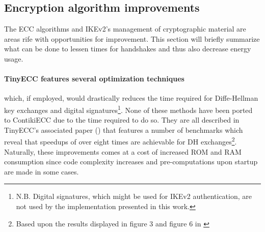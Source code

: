 \documentclass[final,a4paper,twoside,11pt,onecolumn]{report}
\begin{document}



%


\subsection{Encryption algorithm improvements}
\label{sec:ecc-improvements}
The ECC algorithms and IKEv2's management of cryptographic material are areas rife with opportunities for improvement. This section will briefly summarize what can be done to lessen times for handshakes and thus also decrease energy usage.

\paragraph{TinyECC features several optimization techniques} which, if employed, would drastically reduces the time required for Diffe-Hellman key exchanges and digital signatures\footnote{N.B. Digital signatures, which might be used for IKEv2 authentication, are not used by the implementation presented in this work.}. None of these methods have been ported to ContikiECC due to the time required to do so. They are all described in TinyECC's associated paper (\cite{liu2008tinyecc}) that features a number of benchmarks which reveal that speedups of over eight times are achievable for DH exchanges\footnote{Based upon the results displayed in figure 3 and figure 6 in \cite{liu2008tinyecc}}. Naturally, these improvements comes at a cost of increased ROM and RAM consumption since code complexity increases and pre-computations upon startup are made in some cases.
\end{document}
